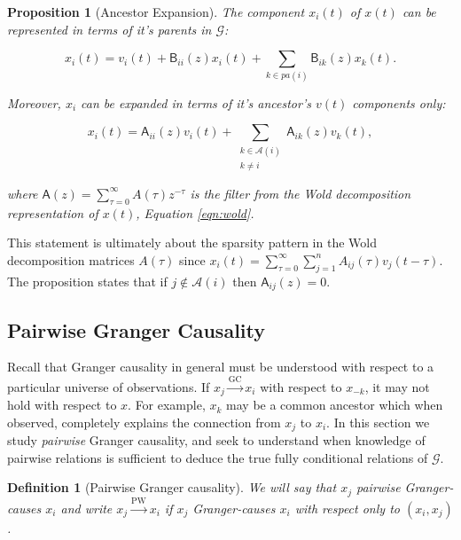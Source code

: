 \documentclass{statsoc}
\def\gc{\overset{\text{GC}}{\rightarrow}}  %
\def\pwgc{\overset{\text{PW}}{\rightarrow}}  %
\def\gcg{\mathcal{G}}  %
\def\B{\mathsf{B}}  %
\def\A{\mathsf{A}}  %
\newcommand{\pa}[1]{pa(#1)}  %
\newcommand{\anc}[1]{\mathcal{A}(#1)}  %
\newtheorem{proposition}{Proposition}
\newtheorem{definition}{Definition}
\begin{document}
\begin{proposition}[Ancestor Expansion]
  \label{prop:parent_expanding}
  The component $x_i(t)$ of $x(t)$ can be represented in terms of it's
  parents in $\gcg$:

  \begin{equation}
    \label{eqn:parent_expansion}
    x_i(t) = v_i(t) + \B_{ii}(z)x_i(t) + \sum_{k \in \pa{i}}\B_{ik}(z)x_k(t).
  \end{equation}

  Moreover, $x_i$ can be expanded in terms of it's ancestor's $v(t)$
  components only:

  \begin{equation}
    \label{eqn:ancestor_expansion}
    x_i(t) = \A_{ii}(z)v_i(t) + \sum_{\substack{k \in \anc{i} \\ k \ne i}}\A_{ik}(z)v_k(t),
  \end{equation}

  where $\A(z) = \sum_{\tau = 0}^\infty A(\tau)z^{-\tau}$ is the filter from
  the Wold decomposition representation of $x(t)$, Equation
  \eqref{eqn:wold}.
\end{proposition}

This statement is ultimately about the sparsity pattern in the Wold
decomposition matrices $A(\tau)$ since
$x_i(t) = \sum_{\tau = 0}^\infty \sum_{j = 1}^n A_{ij}(\tau)v_j(t -
\tau)$.  The proposition states that if $j \not \in \anc{i}$ then
$\A_{ij}(z) = 0$.  

\subsection{Pairwise Granger Causality}
\label{sec:pwgc}
Recall that Granger causality in general must be understood with
respect to a particular universe of observations.  If $x_j \gc x_i$
with respect to $x_{-k}$, it may not hold with respect to $x$.  For
example, $x_k$ may be a common ancestor which when observed, completely
explains the connection from $x_j$ to $x_i$.  In this section we study
\textit{pairwise} Granger causality, and seek to understand when
knowledge of pairwise relations is sufficient to deduce the true fully
conditional relations of $\gcg$.

\begin{definition}[Pairwise Granger causality]
  We will say that $x_j$ pairwise Granger-causes $x_i$ and write
  $x_j \pwgc x_i$ if $x_j$ Granger-causes $x_i$ with respect only to
  $(x_i, x_j)$.
\end{definition}
\end{document}
